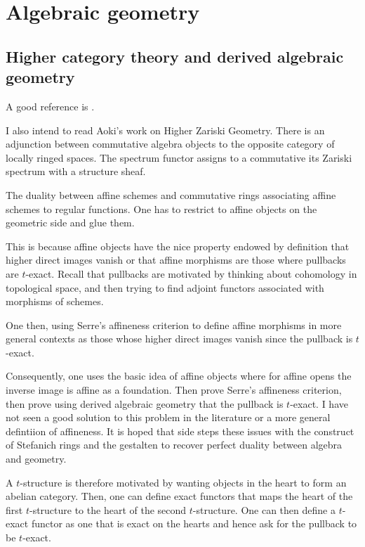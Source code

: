 \section{Algebraic geometry}

\subsection{Higher category theory and derived algebraic geometry}

A good reference is \cite{Scholze2026GeometryHigherCategoryTheory}.

I also intend to read Aoki's work on Higher Zariski Geometry. There is an adjunction between commutative algebra objects to the opposite category of locally ringed spaces. The spectrum functor assigns to a commutative its Zariski spectrum with a structure sheaf.

The duality between affine schemes and commutative rings associating affine schemes to regular functions. One has to restrict to affine objects on the geometric side and glue them. 

This is because affine objects have the nice property endowed by definition that higher direct images vanish or that affine morphisms are those where pullbacks are $t$-exact. Recall that pullbacks are motivated by thinking about cohomology in topological space, and then trying to find adjoint functors associated with morphisms of schemes.

One then, using Serre's affineness criterion to define affine morphisms in more general contexts as those whose higher direct images vanish since the pullback is $t$-exact. 

Consequently, one uses the basic idea of affine objects where for affine opens the inverse image is affine as a foundation. Then prove Serre's affineness criterion, then prove using derived algebraic geometry that the pullback is $t$-exact. I have not seen a good solution to this problem in the literature or a more general defintiion of affineness. It is hoped that \cite{Scholze2026GeometryHigherCategoryTheory} side steps these issues with the construct of Stefanich rings and the gestalten to recover perfect duality between algebra and geometry.

A $t$-structure is therefore motivated by wanting objects in the heart to form an abelian category. Then, one can define exact functors that maps the heart of the first $t$-structure to the heart of the second $t$-structure. One can then define a $t$-exact functor as one that is exact on the hearts and hence ask for the pullback to be $t$-exact.

